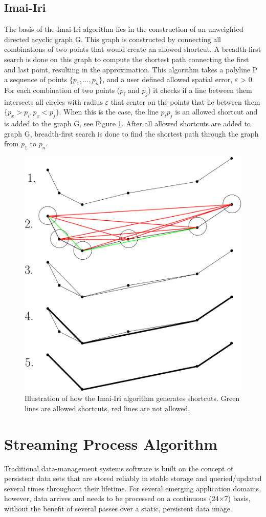 \documentclass[twoside,12pt, a4paper]{report}
\begin{document}
\subsection{Imai-Iri}
\cite{van2017extensive}
The basis of the Imai-Iri algorithm \cite{IMAI198631} lies in the construction
of an unweighted directed acyclic graph G.
This graph is constructed by connecting all combinations
of two points that would create an allowed shortcut.
A breadth-first search is done on this graph to
compute the shortest path connecting the first and last
point, resulting in the approximation.
This algorithm takes a polyline P a sequence of
points $\{p_{1},..., p_{n}\}$, and a user defined allowed spatial
error, $\varepsilon $ > 0. For each combination of two points ($p_{i}$ and $p_{j}$) it checks if a line between them intersects all
circles with radius $\varepsilon $ that center on the points that lie{\tiny {\tiny }}
between them $\{p_{x} > p_{i},p_{x} < p_{j}\}$. When this is the
case, the line $p_{i}p_{j}$ is an allowed shortcut and is added
to the graph G, see Figure \ref{fig:imai}. After all allowed shortcuts
are added to graph G, breadth-first search is done
to find the shortest path through the graph from $p_{1}$ to $p_{n}$.

\begin{figure}
    \centering
    \includegraphics[width=0.5\linewidth]{figures/imaiiri.png}
    \caption{\cite{van2017extensive} Illustration of how the Imai-Iri algorithm generates
shortcuts. Green lines are allowed shortcuts, red
lines are not allowed.}
    \label{fig:imai}
\end{figure}

\section{Streaming Process Algorithm}
\cite{garofalakis2016data}
Traditional data-management systems software is built on the concept of persistent
data sets that are stored reliably in stable storage and queried/updated several
times throughout their lifetime. For several emerging application domains, however,
data arrives and needs to be processed on a continuous (24×7) basis, without
the benefit of several passes over a static, persistent data image. 
\end{document}
